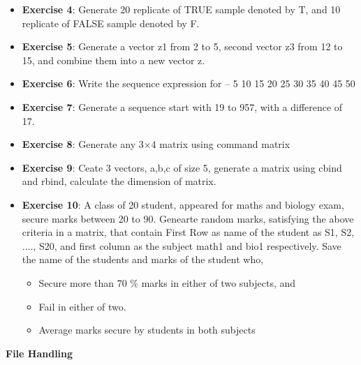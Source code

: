 \documentclass[12pt]{beamer}
\begin{document}
\begin{frame}[fragile]
\begin{itemize}\justifying
	\item \textbf{Exercise 4}: Generate 20 replicate of TRUE sample
	denoted by T, and 10 replicate of FALSE sample denoted
	by F.
	\item \textbf{Exercise 5}: Generate a vector z1 from 2 to 5, second
	vector z3 from 12 to 15, and combine them into a new
	vector z.
	\item \textbf{Exercise 6}: Write the sequence expression for
	– 5 10 15 20 25 30 35 40 45 50
	\item \textbf{Exercise 7}: Generate a sequence start with 19 to 957,
	with a difference of 17.
	\item \textbf{Exercise 8}: Generate any 3$\times$4 matrix using command
	matrix
	\item \textbf{Exercise 9}: Ceate 3 vectors, a,b,c of size 5, generate a
	matrix using cbind and rbind, calculate the dimension of
	matrix.
\end{itemize}
\end{frame}

\begin{frame}[fragile]
\begin{itemize}\justifying
	\item \textbf{Exercise 10}: A class of 20 student, appeared for maths
	and biology exam, secure marks between 20 to 90.
	Genearte random marks, satisfying the above criteria in a
	matrix, that contain First Row as name of the student as
	S1, S2, ...., S20, and first column as the subject math1
	and bio1 respectively.
	Save the name of the students and marks of the student
	who,
	\begin{itemize}\justifying
	\item Secure more than 70 \% marks in either of two
	subjects, and
	\item  Fail in either of two.
	\item  Average marks secure by students in both subjects
\end{itemize}
\end{itemize}
\end{frame}

\begin{frame}
\begin{center}
	\begin{block}{}
		\hspace*{2in}\textbf{\LARGE \textcolor{idrbt_blue}{File Handling}}
\end{block}\end{center}
\end{frame}
\end{document}
